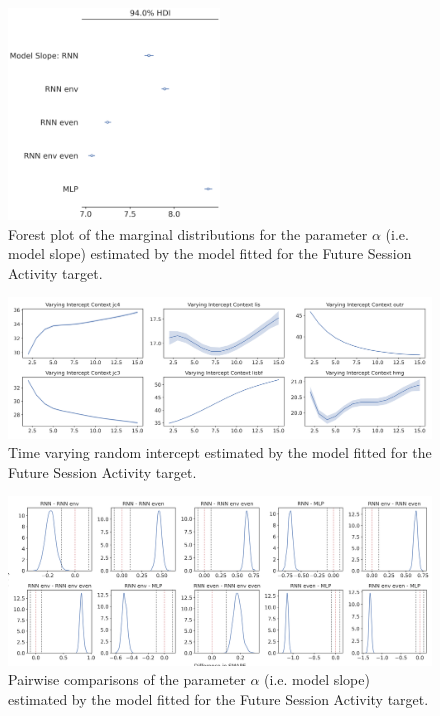 \begin{figure}[ht]
\centering
\includegraphics[width=0.5\textwidth]{images/appendix_C/Future Session Activity_models_3.png}
\caption[\textbf{Future session activity model fixed effect}]{Forest plot of the marginal distributions for the parameter $\alpha$ (i.e. model slope) estimated by the model fitted for the Future Session Activity target.}
\label{model_acti_3}
\end{figure} \FloatBarrier

\begin{figure}[ht]
\centering
\includegraphics[width=\textwidth]{images/appendix_C/Future Session Activity_interc_3.png}
\caption[\textbf{Future session activity time-varying random intercept}]{Time varying random intercept estimated by the model fitted for the Future Session Activity target.}
\label{interc_acti_3}
\end{figure} \FloatBarrier

\begin{figure}[ht]
\centering
\includegraphics[width=\textwidth]{images/appendix_C/Future_Session_Activity_comp_3.png}
\caption[\textbf{Future session activity pairwise comparisons of model fixed effect}]{Pairwise comparisons of the parameter $\alpha$ (i.e. model slope) estimated by the model fitted for the Future Session Activity target.}
\label{comp_acti_3}
\end{figure} \FloatBarrier

